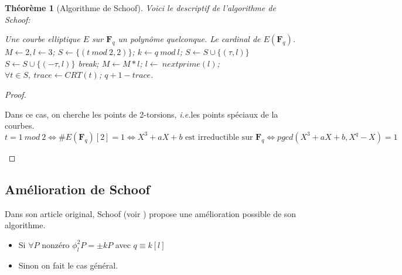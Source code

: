 \documentclass{article}%
\theoremstyle{plain}
\newtheorem{theoreme}{Théorème}[section]
\theoremstyle{definition}
\theoremstyle{plain}
\theoremstyle{remark}
\newcommand\fq{\mathbf{F}_{q}}
\newcommand\ie{\textit{i.e.}}
\begin{document}
\begin{theoreme}[Algorithme de Schoof]
Voici le descriptif de l’algorithme de Schoof:

\begin{algorithm}
\caption{Algorithme de Shoof}
\label{schoof1}
\begin{algorithmic} 
\REQUIRE Une courbe elliptique $E$ sur $\fq$ un polynôme quelconque.
\ENSURE Le cardinal de $E(\fq)$.
\STATE $M\leftarrow 2, l\leftarrow 3$;
\STATE $S\leftarrow \{(t\ mod\ 2, 2)\}$; 
    \STATE $k\leftarrow q\ mod\ l$;	
            \STATE $S\leftarrow S\cup \{(\tau, l)\}$ \OR $S\leftarrow S\cup \{(-\tau, l)\}$ 
            \STATE break;
        \ENDIF
    \ENDFOR
    \STATE $M\leftarrow M*l$;
    \STATE $l\leftarrow\ nextprime(l)$; 	
\ENDWHILE
\STATE $\forall t\in S,\ trace\leftarrow CRT(t)$; 
\RETURN $q + 1 - trace$.
\end{algorithmic}
\end{algorithm}
\end{theoreme}

\begin{proof}
\begin{description}
\item
\item[Cas mod 2] Dans ce cas, on cherche les points de 2-torsions, \ie les points spéciaux de la courbes.
$$t=1\ mod\ 2 \Leftrightarrow \#E(\fq)[2] = 1 \Leftrightarrow X^{3} + aX + b\text{ est irreductible sur }\fq\Leftrightarrow pgcd(X^{3} + aX + b, X^{q} - X) = 1$$
\item 
\end{description}
\end{proof}










\subsection{Amélioration de Schoof}

Dans son article original, Schoof (voir \cite{ref1}) propose une amélioration possible de son algorithme.
\begin{itemize}
\item Si $\forall P$ nonzéro $\phi_{l}^{2}P = \pm kP$ avec $q\equiv k[l]$ 
\item Sinon on fait le cas général.
\end{itemize}
\end{document}
